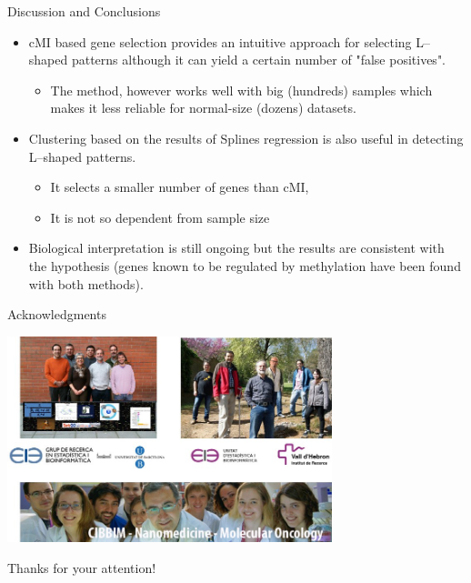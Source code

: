 \documentclass[handout]{beamer}
\begin{document}
\begin{frame}{Discussion and Conclusions}
  \begin{itemize}
  \item cMI based gene selection provides an intuitive approach for selecting L--shaped patterns although it can yield a certain number of "false positives".
  \begin{itemize}
         \item The method, however works well with big (hundreds) samples which makes it less reliable for normal-size (dozens) datasets.
  \end{itemize}
  \item Clustering based on the results of Splines regression is also useful in detecting L--shaped patterns.
       \begin{itemize}
         \item It selects a smaller number of genes than cMI,
         \item It is not so dependent from sample size
       \end{itemize}
  \item Biological interpretation is still ongoing but the results are consistent with the hypothesis
    (genes known to be regulated by methylation have been found with both methods).
\end{itemize}
\end{frame}

\begin{frame}{Acknowledgments}
 \begin{center}
\includegraphics[height=6cm]{./images/agraiments.jpg}
\end{center}
  \end{frame}

\begin{frame}
 \begin{center}
 {\Large
Thanks for your attention!}
\end{center}
  \end{frame}
\end{document}

